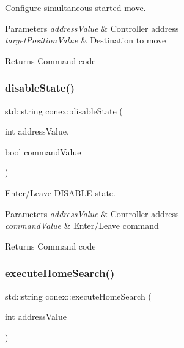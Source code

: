 Configure simultaneous started move. 


\begin{DoxyParams}{Parameters}
{\em address\+Value} & Controller address \\
\hline
{\em target\+Position\+Value} & Destination to move \\
\hline
\end{DoxyParams}
\begin{DoxyReturn}{Returns}
Command code 
\end{DoxyReturn}
\mbox{\label{namespaceconex_a379241e6a2dafd2c5378ff9029a2afbb}} 
\subsubsection{\texorpdfstring{disable\+State()}{disableState()}}
{\footnotesize\ttfamily std\+::string conex\+::disable\+State (\begin{DoxyParamCaption}\item[{int}]{address\+Value,  }\item[{bool}]{command\+Value }\end{DoxyParamCaption})}



Enter/\+Leave D\+I\+S\+A\+B\+LE state. 


\begin{DoxyParams}{Parameters}
{\em address\+Value} & Controller address \\
\hline
{\em command\+Value} & Enter/\+Leave command \\
\hline
\end{DoxyParams}
\begin{DoxyReturn}{Returns}
Command code 
\end{DoxyReturn}
\mbox{\label{namespaceconex_a31e52a12a8f66df0c10a49931f7fce47}} 
\subsubsection{\texorpdfstring{execute\+Home\+Search()}{executeHomeSearch()}}
{\footnotesize\ttfamily std\+::string conex\+::execute\+Home\+Search (\begin{DoxyParamCaption}\item[{int}]{address\+Value }\end{DoxyParamCaption})}



